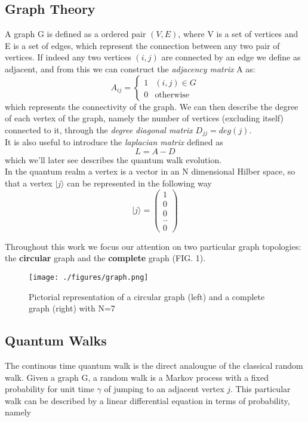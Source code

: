 \documentclass[aps,pra,reprint, onecolumn]{revtex4-2}
\begin{document}
\subsection{Graph Theory}
A graph G is defined as a ordered pair $(V,E)$, where V is a set of vertices and E is a set of edges, which represent the connection between any two pair of vertices. If indeed any two vertices $(i,j)$ are connected by an edge we define as adjacent, and from this we can construct the \textit{adjacency matrix} A as:
\begin{equation}
A_{ij} = \begin{cases} 1 & (i,j)\in G \\ 0 & \mbox{otherwise} \end{cases}
\end{equation}
which represents the connectivity of the graph. We can then describe the degree of each vertex of the graph, namely the number of vertices (excluding itself) connected to it, through the \textit{degree diagonal matrix} $D_{jj} = deg(j)$.\\
It is also useful to introduce the \textit{laplacian matrix} defined as
\begin{equation}
  L = A-D
\end{equation}
which we'll later see describes the quantum walk evolution.\\
In the quantum realm a vertex is a vector in an N dimensional Hilber space, so that a vertex $|j\rangle$ can be represented in the following way
\begin{equation}
  |j\rangle = \begin{pmatrix} 1 \\ 0 \\ 0 \\ .. \\0 \end{pmatrix}
\end{equation}

Throughout this work we focus our attention on two particular graph topologies: the \textbf{circular} graph and the \textbf{complete} graph (FIG. 1).


\begin{figure}[ht]
\texttt{[image: ./figures/graph.png]}%
\caption{Pictorial representation of a circular graph (left) and a complete graph (right) with N=7}
\end{figure}

\subsection{Quantum Walks}
The continous time quantum walk is the direct analougue of the classical random walk. Given a graph G, a random walk is a Markov process with a fixed probability for unit time $\gamma$ of jumping to an adjacent vertex $j$. This particular walk can be described by a linear differential equation in terms of probability, namely
\end{document}
